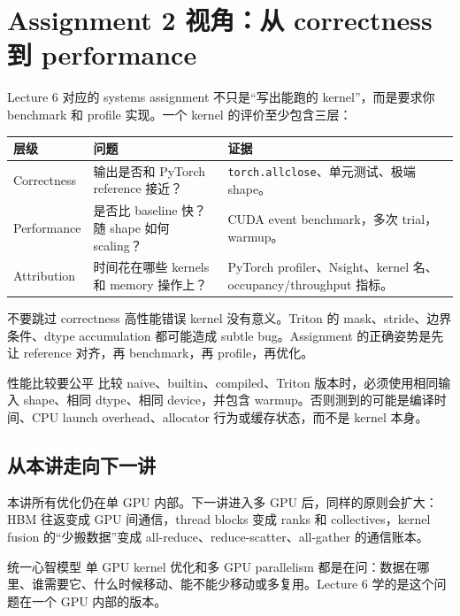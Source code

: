 \section{Assignment 2 视角：从 correctness 到 performance}

Lecture 6 对应的 systems assignment 不只是“写出能跑的 kernel”，而是要求你 benchmark 和 profile 实现。一个 kernel 的评价至少包含三层：

\begin{longtable}{p{}p{}p{}}
\toprule
\textbf{层级} & \textbf{问题} & \textbf{证据} \\
\midrule
Correctness & 输出是否和 PyTorch reference 接近？ & \texttt{torch.allclose}、单元测试、极端 shape。 \\
Performance & 是否比 baseline 快？随 shape 如何 scaling？ & CUDA event benchmark，多次 trial，warmup。 \\
Attribution & 时间花在哪些 kernels 和 memory 操作上？ & PyTorch profiler、Nsight、kernel 名、occupancy/throughput 指标。 \\
\bottomrule
\end{longtable}

\begin{importantbox}{不要跳过 correctness}
高性能错误 kernel 没有意义。Triton 的 mask、stride、边界条件、dtype accumulation 都可能造成 subtle bug。Assignment 的正确姿势是先让 reference 对齐，再 benchmark，再 profile，再优化。
\end{importantbox}

\begin{warningbox}{性能比较要公平}
比较 naive、builtin、compiled、Triton 版本时，必须使用相同输入 shape、相同 dtype、相同 device，并包含 warmup。否则测到的可能是编译时间、CPU launch overhead、allocator 行为或缓存状态，而不是 kernel 本身。
\end{warningbox}

\subsection{从本讲走向下一讲}

本讲所有优化仍在单 GPU 内部。下一讲进入多 GPU 后，同样的原则会扩大：HBM 往返变成 GPU 间通信，thread blocks 变成 ranks 和 collectives，kernel fusion 的“少搬数据”变成 all-reduce、reduce-scatter、all-gather 的通信账本。

\begin{knowledgebox}{统一心智模型}
单 GPU kernel 优化和多 GPU parallelism 都是在问：数据在哪里、谁需要它、什么时候移动、能不能少移动或多复用。Lecture 6 学的是这个问题在一个 GPU 内部的版本。
\end{knowledgebox}

